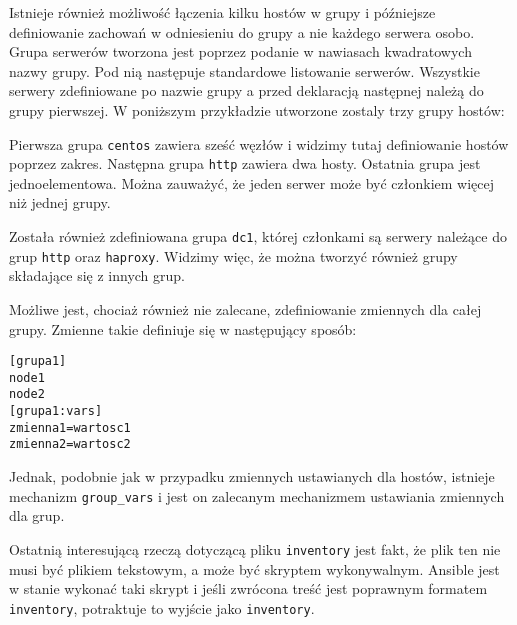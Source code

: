 Istnieje również możliwość łączenia kilku hostów w grupy i późniejsze definiowanie zachowań w odniesieniu do grupy a nie każdego serwera osobo.
Grupa serwerów tworzona jest poprzez podanie w nawiasach kwadratowych nazwy grupy. Pod nią następuje standardowe listowanie serwerów.
Wszystkie serwery zdefiniowane po nazwie grupy a przed deklaracją następnej należą do grupy pierwszej.
W poniższym przykładzie utworzone zostaly trzy grupy hostów:

Pierwsza grupa \texttt{centos} zawiera sześć węzłów i widzimy tutaj definiowanie hostów poprzez zakres.
Następna grupa \texttt{http} zawiera dwa hosty.
Ostatnia grupa jest jednoelementowa.
Można zauważyć, że jeden serwer może być członkiem więcej niż jednej grupy.

Została również zdefiniowana grupa \texttt{dc1}, której członkami są serwery należące do grup \texttt{http} oraz \texttt{haproxy}.
Widzimy więc, że można tworzyć również grupy składające się z innych grup.

Możliwe jest, chociaż również nie zalecane, zdefiniowanie zmiennych dla całej grupy.
Zmienne takie definiuje się w następujący sposób:
\begin{lstlisting}
[grupa1]
node1
node2
[grupa1:vars]
zmienna1=wartosc1
zmienna2=wartosc2
\end{lstlisting}
Jednak, podobnie jak w przypadku zmiennych ustawianych dla hostów, istnieje mechanizm \texttt{group\_vars} i jest on zalecanym mechanizmem ustawiania zmiennych dla grup.

Ostatnią interesującą rzeczą dotyczącą pliku \texttt{inventory} jest fakt, że plik ten nie musi być plikiem tekstowym, a może być skryptem wykonywalnym.
Ansible jest w stanie wykonać taki skrypt i jeśli zwrócona treść jest poprawnym formatem \texttt{inventory}, potraktuje to wyjście jako \texttt{inventory}.
